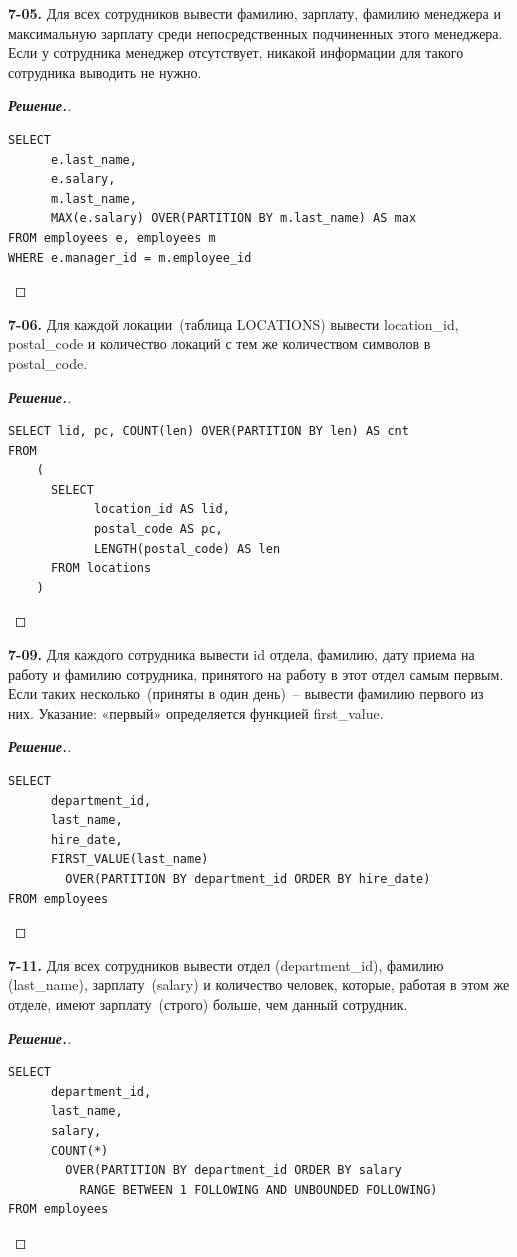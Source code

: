 \documentclass[a4paper]{article}
\newcommand{\MYlvm}{\leavevmode\vspace{-0.3cm}}		%
\begin{document}
\noindent
{\bf 7-05.}
Для всех сотрудников вывести фамилию, зарплату, фамилию менеджера и максимальную
зарплату среди непосредственных подчиненных этого менеджера.
Если у сотрудника менеджер отсутствует, никакой информации для такого сотрудника
выводить не нужно.

\begin{proof}[{\bf Решение.}]\MYlvm\\
\begin{lstlisting}
SELECT 
      e.last_name, 
      e.salary, 
      m.last_name, 
      MAX(e.salary) OVER(PARTITION BY m.last_name) AS max
FROM employees e, employees m
WHERE e.manager_id = m.employee_id
\end{lstlisting}
\end{proof}


\noindent
{\bf 7-06.}
Для каждой локации~(таблица LOCATIONS) вывести location\_id, postal\_code и количество локаций с тем же количеством символов в postal\_code.

\begin{proof}[{\bf Решение.}]\MYlvm\\
\begin{lstlisting}
SELECT lid, pc, COUNT(len) OVER(PARTITION BY len) AS cnt
FROM
    (
      SELECT 
            location_id AS lid, 
            postal_code AS pc, 
            LENGTH(postal_code) AS len
      FROM locations
    )
\end{lstlisting}
\end{proof}


\noindent
{\bf 7-09.}
Для каждого сотрудника вывести id отдела, фамилию, дату приема на работу и 
фамилию сотрудника, принятого на работу в этот отдел самым первым. 
Если таких несколько~(приняты в один день)~-- вывести фамилию первого из них. 
Указание: «первый» определяется функцией first\_value.

\begin{proof}[{\bf Решение.}]\MYlvm\\
\begin{lstlisting}
SELECT 
      department_id, 
      last_name, 
      hire_date, 
      FIRST_VALUE(last_name)
        OVER(PARTITION BY department_id ORDER BY hire_date)
FROM employees
\end{lstlisting}
\end{proof}


\noindent
{\bf 7-11.}
Для всех сотрудников вывести отдел (department\_id), фамилию (last\_name), 
зарплату~(salary) и количество человек, которые, работая в этом же отделе, имеют зарплату~(строго) больше, чем данный 
сотрудник.

\begin{proof}[{\bf Решение.}]\MYlvm\\
\begin{lstlisting}
SELECT 
      department_id, 
      last_name, 
      salary, 
      COUNT(*) 
        OVER(PARTITION BY department_id ORDER BY salary 
          RANGE BETWEEN 1 FOLLOWING AND UNBOUNDED FOLLOWING) 
FROM employees
\end{lstlisting}
\end{proof}
\end{document}

